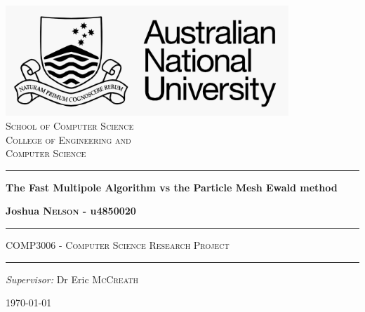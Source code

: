 \documentclass[pdftex,twoside,a4paper]{report}
\begin{document}
\begin{titlepage}
 
\begin{center}

\includegraphics[width=0.8\textwidth]{logoWhite.png}\\[0.5cm]
\textsc{\Large School of Computer Science}\\[0.5cm]
\textsc{\Large College of Engineering and}\\[0.2cm]
\textsc{\Large Computer Science}\\[0.5cm]


 
\vspace{1.4cm}

\hrule

\vspace{1.4cm}

{ \huge \bfseries The Fast Multipole Algorithm vs the Particle Mesh Ewald method} \\

\vspace{0.4cm}

{ \LARGE \bfseries Joshua \textsc{Nelson} - u4850020} \\

\vspace{1.4cm}


\hrule

\vspace{1.0cm}

\textsc{\large COMP3006 - Computer Science Research Project}\\

\vspace{1.0cm}

\hrule

\vspace{1.4cm}



\emph{Supervisor: } 
Dr Eric \textsc{McCreath} \\

 
\vfill
 
{\large \today}
 
\end{center}
 
\end{titlepage}
\end{document}
